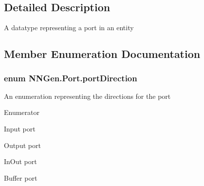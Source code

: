 \subsection{Detailed Description}
A datatype representing a port in an entity 



\subsection{Member Enumeration Documentation}
\hypertarget{class_n_n_gen_1_1_port_ac3b8f11a7a6bd6872e6954b64721d90c}{}
\subsubsection[{port\+Direction}]{\setlength{\rightskip}{0pt plus 5cm}enum {\bf N\+N\+Gen.\+Port.\+port\+Direction}\hspace{0.3cm}{\ttfamily [strong]}}\label{class_n_n_gen_1_1_port_ac3b8f11a7a6bd6872e6954b64721d90c}


An enumeration representing the directions for the port 

\begin{Desc}
\item[Enumerator]\par
\begin{description}
\item[{\em 
\hypertarget{class_n_n_gen_1_1_port_ac3b8f11a7a6bd6872e6954b64721d90cac86ee0d9d7ed3e7b4fdbf486fa6c0ebb}{}I\+N\label{class_n_n_gen_1_1_port_ac3b8f11a7a6bd6872e6954b64721d90cac86ee0d9d7ed3e7b4fdbf486fa6c0ebb}
}]Input port \item[{\em 
\hypertarget{class_n_n_gen_1_1_port_ac3b8f11a7a6bd6872e6954b64721d90caef373774188a51f80463f37b6bd9e83a}{}O\+U\+T\label{class_n_n_gen_1_1_port_ac3b8f11a7a6bd6872e6954b64721d90caef373774188a51f80463f37b6bd9e83a}
}]Output port \item[{\em 
\hypertarget{class_n_n_gen_1_1_port_ac3b8f11a7a6bd6872e6954b64721d90ca0c93f5d83bbb636236e9610d01e4f3cd}{}I\+N\+O\+U\+T\label{class_n_n_gen_1_1_port_ac3b8f11a7a6bd6872e6954b64721d90ca0c93f5d83bbb636236e9610d01e4f3cd}
}]In\+Out port \item[{\em 
\hypertarget{class_n_n_gen_1_1_port_ac3b8f11a7a6bd6872e6954b64721d90ca17de626bcae5109bb2f7a66dfc4a8a1d}{}B\+U\+F\+F\+E\+R\label{class_n_n_gen_1_1_port_ac3b8f11a7a6bd6872e6954b64721d90ca17de626bcae5109bb2f7a66dfc4a8a1d}
}]Buffer port \end{description}
\end{Desc}


